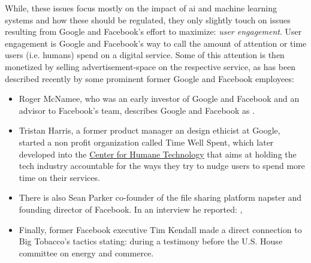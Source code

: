While, these issues focus mostly on the impact of \gls{ai} and machine learning systems and how these should be regulated, they only slightly touch on issues resulting from Google and Facebook's effort to maximize: \emph{user engagement}. 
User engagement is  Google and Facebook's way to call the amount of attention or time users (i.e. humans) spend on a digital service.
Some of this attention is then monetized by selling advertisement-space on the respective service, as has been described recently by some prominent former Google and Facebook employees:
\begin{itemize}
    \item Roger McNamee, who was an early investor of Google and Facebook and an advisor to Facebook's team, describes Google and Facebook as  \citep{mcnamee_i_2017}.
    \item Tristan Harris, a former product manager an design ethicist at Google, started a non profit organization called Time Well Spent, which later developed into the \href{https://www.humanetech.com/who-we-are}{Center for Humane Technology} that aims at holding the tech industry accountable for the ways they try to nudge users to spend more time on their services. \citep{metz_smartphones_2017}
    \item There is also Sean Parker co-founder of the file sharing platform napster and founding director of Facebook. In an interview he reported:  ,  \citep{allen_sean_2017}
    \item Finally, former Facebook executive Tim Kendall made a direct connection to Big Tobacco's tactics stating:  \citep{kendall_house_2020} during a testimony before the U.S. House committee on energy and commerce.
\end{itemize}


